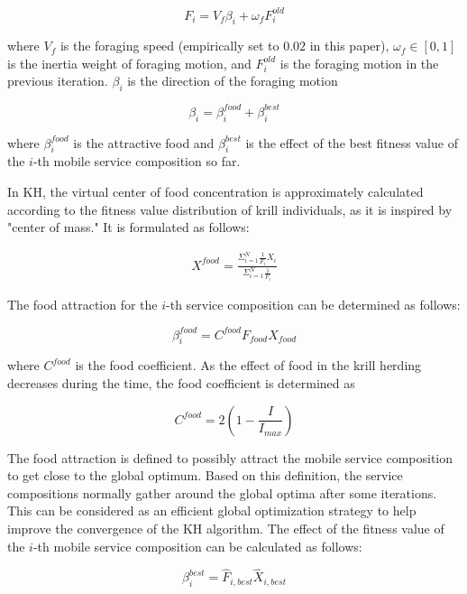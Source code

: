 \documentclass[10pt,journal,compsoc]{IEEEtran}
\begin{document}
\begin{equation}
F_i = V_f\beta_i + \omega_f F^{old}_i
\end{equation}

where $V_f$ is the foraging speed (empirically set to $0.02$ in this paper), $\omega_f∈ [0, 1]$ is the inertia weight of foraging motion, and $F^{old}_i$ is the foraging motion in the previous iteration. $\beta_i$ is the direction of the foraging motion

\begin{equation}
\beta_i = \beta_i^{food}+\beta_i^{best}
\end{equation}

where $\beta^{food}_i$ is the attractive food and $\beta^{best}_i$ is the effect of the best fitness value of the $i$-th mobile service composition so far. 

In KH, the virtual center of food concentration is approximately calculated according to the fitness value distribution of krill individuals, as it is inspired by "center of mass." It is formulated as follows:

\begin{eqnarray}
X^{food} = \frac{\Sigma_{i=1}^N \frac{1}{F_i}X_i}{\Sigma_{i=1}^{N}\frac{1}{F_i}}
\end{eqnarray}

The food attraction for the $i$-th service composition can be determined as follows:

\begin{equation}
\beta^{food}_{i} = C^{food}F_{food}X_{food}
\end{equation}

where $C^{food}$ is the food coefficient. As the effect of food in the krill herding decreases during the time, the food coefficient is determined as

\begin{equation}
C^{food} = 2(1-\frac{I}{I_{max}})
\end{equation}

The food attraction is defined to possibly attract the mobile service composition to get close to the global optimum. Based on this definition, the service compositions normally gather around the global optima after some iterations. This can be considered as an efficient global optimization strategy to help improve the convergence of the KH algorithm. The effect of the fitness value of the $i$-th mobile service composition can be calculated as follows:

\begin{equation}
\beta_i^{best} = \hat{F}_{i,best}\hat{X}_{i,best}
\end{equation}
\end{document}
